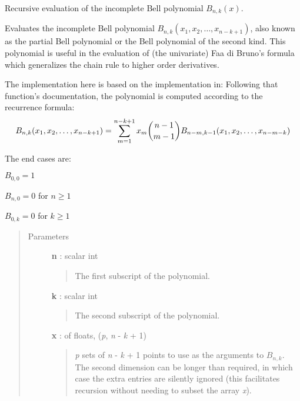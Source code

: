 \documentclass[letterpaper,10pt,english]{sphinxmanual}
\begin{document}
\begin{fulllineitems}
\label{gptools:gptools.utils.incomplete_bell_poly}
Recursive evaluation of the incomplete Bell polynomial \(B_{n, k}(x)\).

Evaluates the incomplete Bell polynomial \(B_{n, k}(x_1, x_2, \dots, x_{n-k+1})\),
also known as the partial Bell polynomial or the Bell polynomial of the
second kind. This polynomial is useful in the evaluation of (the univariate)
Faa di Bruno's formula which generalizes the chain rule to higher order
derivatives.

The implementation here is based on the implementation in:
Following that function's documentation, the polynomial is computed
according to the recurrence formula:
\begin{gather}
\begin{split}B_{n, k}(x_1, x_2, \dots, x_{n-k+1}) = \sum_{m=1}^{n-k+1}x_m\binom{n-1}{m-1}B_{n-m, k-1}(x_1, x_2, \dots, x_{n-m-k})\end{split}\notag
\end{gather}
\begin{DUlineblock}{0em}
\item[] The end cases are:
\item[] \(B_{0, 0} = 1\)
\item[] \(B_{n, 0} = 0\) for \(n \ge 1\)
\item[] \(B_{0, k} = 0\) for \(k \ge 1\)
\end{DUlineblock}
\begin{quote}\begin{description}
\item[{Parameters}] \leavevmode
\textbf{n} : scalar int
\begin{quote}

The first subscript of the polynomial.
\end{quote}

\textbf{k} : scalar int
\begin{quote}

The second subscript of the polynomial.
\end{quote}

\textbf{x} :  of floats, (\emph{p}, \emph{n} - \emph{k} + 1)
\begin{quote}

\emph{p} sets of \emph{n} - \emph{k} + 1 points to use as the arguments to
\(B_{n,k}\). The second dimension can be longer than
required, in which case the extra entries are silently ignored
(this facilitates recursion without needing to subset the array \emph{x}).
\end{quote}


\end{description}
\end{quote}
\end{fulllineitems}
\end{document}
